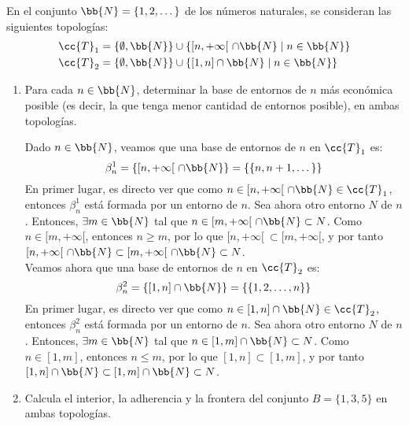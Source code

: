 \documentclass[12pt]{article}
\newcommand{\T}[0]{\cc{T}}
\begin{document}
    \begin{ejercicio}[6 puntos]
        En el conjunto $\bb{N}=\{1,2,\dots\}$  de los números naturales, se consideran las siguientes topologías:
        \begin{equation*}
            \begin{split}
                \T_1&=\{\emptyset, \bb{N}\}\cup \{[n,+\infty[~\cap \bb{N}\mid n\in \bb{N}\}\\\T_2&=\{\emptyset, \bb{N}\}\cup \{[1,n]\cap \bb{N}\mid n\in \bb{N}\}
            \end{split}
        \end{equation*}
        \begin{enumerate}
            \item Para cada $n\in \bb{N}$, determinar la base de entornos de $n$ más económica posible (es decir, la que tenga menor cantidad de entornos posible), en ambas topologías.

            Dado $n\in \bb{N}$, veamos que una base de entornos de $n$ en $\T_1$ es:
            \begin{equation*}
                \beta_n^1=\{[n,+\infty[~\cap \bb{N}\} = \{ \{ n, n+1, \dots \} \}
            \end{equation*}
            En primer lugar, es directo ver que como $n\in [n,+\infty[~\cap \bb{N}\in \T_1$, entonces $\beta_n^1$ está formada por un entorno de $n$.
            Sea ahora otro entorno $N$ de $n$. Entonces, $\exists m\in \bb{N}$ tal que $n\in [m,+\infty[~\cap \bb{N}\subset N$.
            Como $n\in [m,+\infty[$, entonces $n\geq m$, por lo que $[n,+\infty[~\subset [m,+\infty[$, y por tanto $[n,+\infty[~\cap \bb{N}\subset [m,+\infty[~\cap \bb{N}\subset N$.\\

            Veamos ahora que una base de entornos de $n$ en $\T_2$ es:
            \begin{equation*}
                \beta_n^2=\{[1,n]\cap \bb{N}\} = \{ \{ 1, 2, \dots, n \} \}
            \end{equation*}
            En primer lugar, es directo ver que como $n\in [1,n]\cap \bb{N}\in \T_2$, entonces $\beta_n^2$ está formada por un entorno de $n$.
            Sea ahora otro entorno $N$ de $n$. Entonces, $\exists m\in \bb{N}$ tal que $n\in [1,m]\cap \bb{N}\subset N$.
            Como $n\in [1,m]$, entonces $n\leq m$, por lo que $[1,n]\subset [1,m]$, y por tanto $[1,n]\cap \bb{N}\subset [1,m]\cap \bb{N}\subset N$.

            \item Calcula el interior, la adherencia y la frontera del conjunto $B=\{1,3,5\}$ en ambas topologías.
            

\end{enumerate}
\end{ejercicio}
\end{document}
